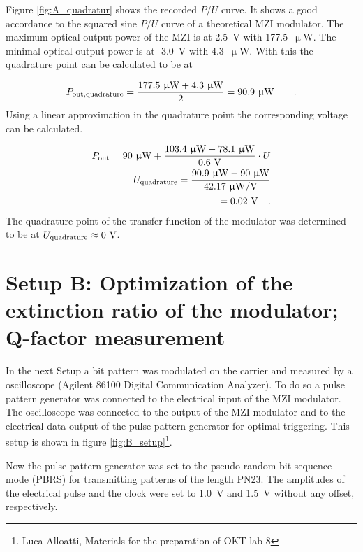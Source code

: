 Figure \ref{fig:A_quadratur} shows the recorded $P$/$U$ curve. It shows a good accordance to the squared sine $P$/$U$ curve of a theoretical MZI modulator.
The maximum optical output power of the MZI is at 2.5~V with 177.5~$\upmu$W. The minimal optical output power is at -3.0~V with 4.3~$\upmu$W. With this the quadrature point can be calculated to be at

\begin{equation}
P_{\mathrm{out,quadrature}}=\frac{177.5~\upmu \mathrm{W}+4.3~\upmu \mathrm{W}}{2}=90.9~\upmu \mathrm{W}\qquad.
\label{eq:}
\end{equation} 
Using a linear approximation in the quadrature point the corresponding voltage can be calculated.

\begin{equation}
\begin{split}
P_{\mathrm{out}}=90~\upmu \mathrm{W} + \frac{103.4~\upmu \mathrm{W}- 78.1~\upmu \mathrm{W}}{0.6~\mathrm{V}}\cdot U\\
U_{\mathrm{quadrature}}=\frac{90.9~\upmu \mathrm{W}-90~\upmu \mathrm{W}}{42.17~\upmu \mathrm{W}/\mathrm{V}}\\
=0.02~\mathrm{V} \quad.
\end{split}
\label{eq:}
\end{equation}
The quadrature point of the transfer function of the modulator was determined to be at $U_{\mathrm{quadrature}}\approx 0~\mathrm{V}$.


\section{Setup B: Optimization of the extinction ratio of the modulator; Q-factor measurement}





In the next Setup a bit pattern was modulated on the carrier and measured by a oscilloscope (Agilent 86100 Digital Communication Analyzer). To do so a pulse pattern generator was connected to the electrical input of the MZI modulator. The oscilloscope was connected to the output of the MZI modulator and to the electrical data output of the pulse pattern generator for optimal triggering. This setup is shown in figure \ref{fig:B_setup}\footnote[3]{Luca Alloatti, Materials for the preparation of OKT lab 8}.

Now the pulse pattern generator was set to the pseudo random bit sequence mode (PBRS) for transmitting patterns of the length PN23. The amplitudes of the electrical pulse and the clock were set to 1.0~V and 1.5~V without any offset, respectively.


